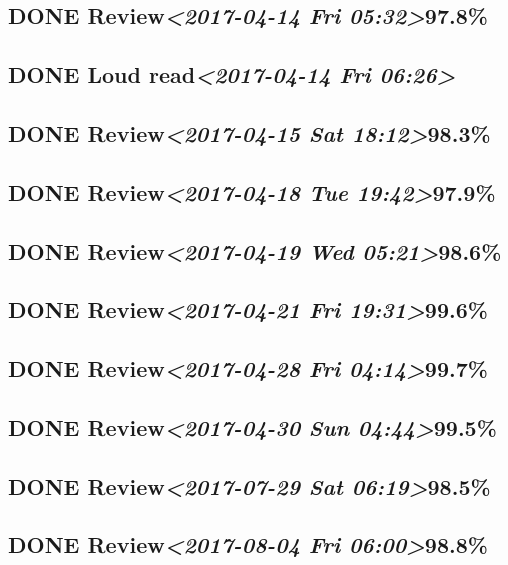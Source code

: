 \documentclass[11pt]{ctexart}
\begin{document}
\subsection{{\bfseries\sffamily DONE} Review\textit{<2017-04-14 Fri 05:32>}97.8\%}
\label{sec:orgfc419a8}
\subsection{{\bfseries\sffamily DONE} Loud read\textit{<2017-04-14 Fri 06:26>}}
\label{sec:orgf850fe9}
\subsection{{\bfseries\sffamily DONE} Review\textit{<2017-04-15 Sat 18:12>}98.3\%}
\label{sec:orgc893863}
\subsection{{\bfseries\sffamily DONE} Review\textit{<2017-04-18 Tue 19:42>}97.9\%}
\label{sec:orgd126a60}
\subsection{{\bfseries\sffamily DONE} Review\textit{<2017-04-19 Wed 05:21>}98.6\%}
\label{sec:orge7b23c1}
\subsection{{\bfseries\sffamily DONE} Review\textit{<2017-04-21 Fri 19:31>}99.6\%}
\label{sec:org57421a3}
\subsection{{\bfseries\sffamily DONE} Review\textit{<2017-04-28 Fri 04:14>}99.7\%}
\label{sec:orgf5ca4ef}
\subsection{{\bfseries\sffamily DONE} Review\textit{<2017-04-30 Sun 04:44>}99.5\%}
\label{sec:org31848a3}
\subsection{{\bfseries\sffamily DONE} Review\textit{<2017-07-29 Sat 06:19>}98.5\%}
\label{sec:org7d9d271}
\subsection{{\bfseries\sffamily DONE} Review\textit{<2017-08-04 Fri 06:00>}98.8\%}
\label{sec:orgfa97703}
\end{document}
